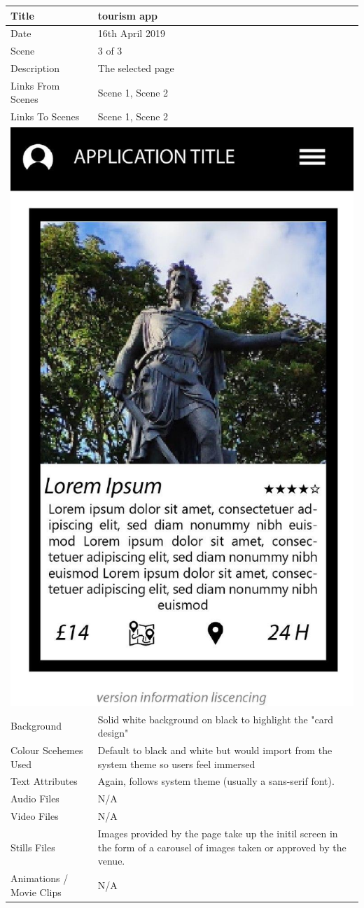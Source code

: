 \hspace{-1cm}
	\centering
	\begin{tabular}{p{4cm}p{10cm}}
		\hline
		Title & tourism app \\
		\hline
		Date & 16th April 2019 \\
		\hline
		Scene & 3 of 3 \\
		\hline
		Description & The selected page \\
		\hline
		Links From Scenes & Scene 1, Scene 2 \\
		\hline
		Links To Scenes & Scene 1, Scene 2 \\
		\hline
		\multicolumn{2}{c}{\includegraphics[width=0.5\linewidth]{images/screen2-1.jpg}} \\
		\hline
		Background & Solid white background on black to highlight the "card design" \\
		\hline
		Colour Scehemes Used & Default to black and white but would import from the system theme so users feel immersed \\
		\hline
		Text Attributes & Again, follows system theme (usually a sans-serif font). \\
		\hline
		Audio Files & N/A \\
		\hline
		Video Files & N/A \\
		\hline
		Stills Files & Images provided by the page take up the initil screen in the form of a carousel of images taken or approved by the venue. \\
		\hline
		Animations / Movie Clips & N/A \\

\end{tabular}
